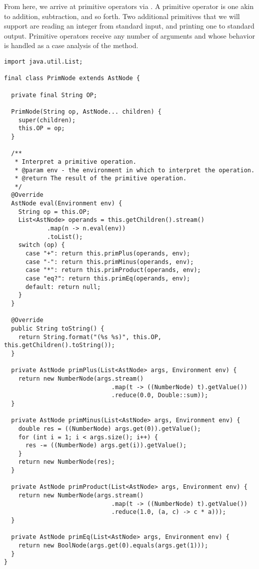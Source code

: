 From here, we arrive at primitive operators via . A primitive operator is one akin to addition, subtraction, and so forth. Two additional primitives that we will support are reading an integer from standard input, and printing one to standard output. Primitive operators receive any number of arguments and whose behavior is handled as a case analysis of the  method. 

\begin{lstlisting}[language=MyJava]
import java.util.List;

final class PrimNode extends AstNode {

  private final String OP;

  PrimNode(String op, AstNode... children) {
    super(children);
    this.OP = op;
  }

  /**
   * Interpret a primitive operation.
   * @param env - the environment in which to interpret the operation.
   * @return The result of the primitive operation.
   */
  @Override
  AstNode eval(Environment env) {
    String op = this.OP;
    List<AstNode> operands = this.getChildren().stream()
            .map(n -> n.eval(env))
            .toList();
    switch (op) {
      case "+": return this.primPlus(operands, env);
      case "-": return this.primMinus(operands, env);
      case "*": return this.primProduct(operands, env);
      case "eq?": return this.primEq(operands, env);
      default: return null;
    }
  }

  @Override
  public String toString() {
    return String.format("(%s %s)", this.OP, this.getChildren().toString());
  }

  private AstNode primPlus(List<AstNode> args, Environment env) {
    return new NumberNode(args.stream()
                              .map(t -> ((NumberNode) t).getValue())
                              .reduce(0.0, Double::sum));
  }

  private AstNode primMinus(List<AstNode> args, Environment env) {
    double res = ((NumberNode) args.get(0)).getValue();
    for (int i = 1; i < args.size(); i++) {
      res -= ((NumberNode) args.get(i)).getValue();
    }
    return new NumberNode(res);
  }

  private AstNode primProduct(List<AstNode> args, Environment env) {
    return new NumberNode(args.stream()
                              .map(t -> ((NumberNode) t).getValue())
                              .reduce(1.0, (a, c) -> c * a)));
  }

  private AstNode primEq(List<AstNode> args, Environment env) {
    return new BoolNode(args.get(0).equals(args.get(1)));
  }
}
\end{lstlisting}

